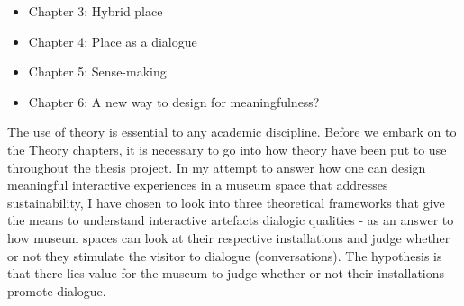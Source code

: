 \begin{itemize}
    \item Chapter 3: Hybrid place
    \item Chapter 4: Place as a dialogue
    \item Chapter 5: Sense-making
    \item Chapter 6: A new way to design for meaningfulness?
\end{itemize}
\par


The use of theory is essential to any academic discipline. Before we embark on to the Theory chapters, it is necessary to go into how theory have been put to use throughout the thesis project. In my attempt to answer how one can design meaningful interactive experiences in a museum space that addresses sustainability, I have chosen to look into three theoretical frameworks that give the means to understand interactive artefacts dialogic qualities - as an answer to how museum spaces can look at their respective installations and judge whether or not they stimulate the visitor to dialogue (conversations). The hypothesis is that there lies value for the museum to judge whether or not their installations promote dialogue. 
